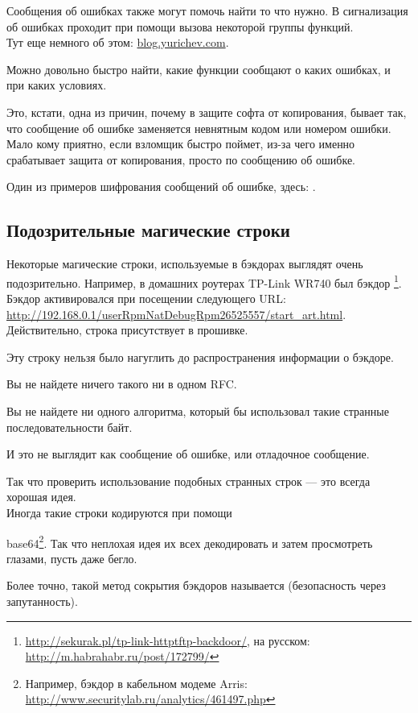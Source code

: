 Сообщения об ошибках также могут помочь найти то что нужно. 
В \oracle сигнализация об ошибках проходит при помощи вызова некоторой группы функций. \\
Тут еще немного об этом: \href{http://go.yurichev.com/17224}{blog.yurichev.com}.

Можно довольно быстро найти, какие функции сообщают о каких ошибках, и при каких условиях.

Это, кстати, одна из причин, почему в защите софта от копирования, 
бывает так, что сообщение об ошибке заменяется 
невнятным кодом или номером ошибки. Мало кому приятно, если взломщик быстро поймет, 
из-за чего именно срабатывает защита от копирования, просто по сообщению об ошибке.

Один из примеров шифрования сообщений об ошибке, здесь: .

\subsection{Подозрительные магические строки}

Некоторые магические строки, используемые в бэкдорах выглядят очень подозрительно.
Например, в домашних роутерах TP-Link WR740 был бэкдор
\footnote{\url{http://sekurak.pl/tp-link-httptftp-backdoor/}, на русском: \url{http://m.habrahabr.ru/post/172799/}}.
Бэкдор активировался при посещении следующего URL:\\
\url{http://192.168.0.1/userRpmNatDebugRpm26525557/start_art.html}.\\
Действительно, строка  присутствует в прошивке.

Эту строку нельзя было нагуглить до распространения информации о бэкдоре.

Вы не найдете ничего такого ни в одном \ac{RFC}.

Вы не найдете ни одного алгоритма, который бы использовал такие странные последовательности байт.

И это не выглядит как сообщение об ошибке, или отладочное сообщение.

Так что проверить использование подобных странных строк --- это всегда хорошая идея.
\\
Иногда такие строки кодируются при помощи

base64\footnote{Например, бэкдор в кабельном модеме Arris: 
\url{http://www.securitylab.ru/analytics/461497.php}}.
Так что неплохая идея их всех декодировать и затем просмотреть глазами, пусть даже бегло.
\\

Более точно, такой метод сокрытия бэкдоров называется  (безопасность через
запутанность).
